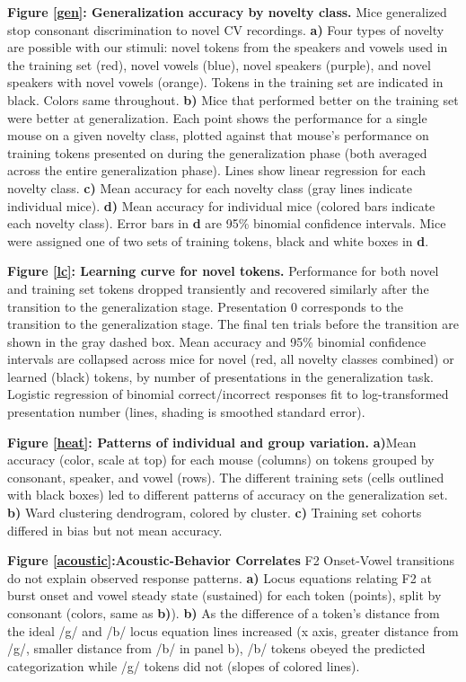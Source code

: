 \documentclass[preprint, NumberedRefs]{JASAnew}\usepackage[]{graphicx}\usepackage[]{color}
\begin{document}
\textbf{Figure \ref{gen}: Generalization accuracy by novelty class.} Mice generalized stop consonant discrimination to novel CV recordings. \textbf{a)} Four types of novelty are possible with our stimuli: novel tokens from the speakers and vowels used in the training set (red), novel vowels (blue), novel speakers (purple), and novel speakers with novel vowels (orange). Tokens in the training set are indicated in black. Colors same throughout. \textbf{b)} Mice that performed better on the training set were better at generalization. Each point shows the performance for a single mouse on a given novelty class, plotted against that mouse's performance on training tokens presented on during the generalization phase (both averaged across the entire generalization phase). Lines show linear regression for each novelty class. \textbf{c)} Mean accuracy for each novelty class (gray lines indicate individual mice). \textbf{d)} Mean accuracy for individual mice (colored bars indicate each novelty class). Error bars in \textbf{d} are 95\% binomial confidence intervals. Mice were assigned one of two sets of training tokens, black and white boxes in \textbf{d}.

\textbf{Figure \ref{lc}: Learning curve for novel tokens.} Performance for both novel and training set tokens dropped transiently and recovered similarly after the transition to the generalization stage. Presentation 0 corresponds to the transition to the generalization stage. The final ten trials before the transition are shown in the gray dashed box. Mean accuracy and 95\% binomial confidence intervals are collapsed across mice for novel (red, all novelty classes combined) or learned (black) tokens, by number of presentations in the generalization task. Logistic regression of binomial correct/incorrect responses fit to log-transformed presentation number (lines, shading is smoothed standard error).


\textbf{Figure \ref{heat}: Patterns of individual and group variation.} \textbf{a)}Mean accuracy (color, scale at top) for each mouse (columns) on tokens grouped by consonant, speaker, and vowel (rows). The different training sets (cells outlined with black boxes) led to different patterns of accuracy on the generalization set. \textbf{b)} Ward clustering dendrogram, colored by cluster. \textbf{c)} Training set cohorts differed in bias but not mean accuracy.

\textbf{Figure \ref{acoustic}:Acoustic-Behavior Correlates} F2 Onset-Vowel transitions do not explain observed response patterns. \textbf{a)} Locus equations relating F2 at burst onset and vowel steady state  (sustained) for each token (points), split by consonant (colors, same as \textbf{b)}). \textbf{b)} As the difference of a token's distance from the ideal /g/ and /b/ locus equation lines increased (x axis, greater distance from /g/, smaller distance from /b/ in panel b), /b/ tokens obeyed the predicted categorization while /g/ tokens did not (slopes of colored lines). 
\end{document}
